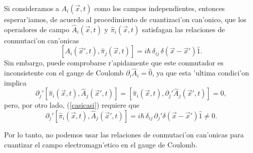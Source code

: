 Si consideramos a $A_i(\vec{x},t) $ como los campos independientes, entonces
esperar'iamos, de acuerdo al procedimiento de cuantizaci'on can'onico, que los
operadores de campo $\hat{A}_i(\vec{x},t)$ y $\hat{\pi}_i(\vec{x},t)$ satisfagan
las relaciones de conmutaci'on can'onicas
\begin{equation}
\left[\hat{A}_i(\vec{x}',t),\hat{\pi}_j(\vec{x},t)\right]
=i\hbar\,\delta_{ij}\,\delta(\vec{x}-\vec{x}') \hat{1}. \label{casicasi}
\end{equation}
Sin embargo, puede comprobarse r'apidamente que este conmutador es inconsistente
con el gauge de Coulomb
$\partial_i\hat{A}_{i}=\hat{0}$, ya que esta 'ultima condici'on implica
\begin{equation}
\partial_{j}'\left[ \hat{\pi}_i(\vec{x},t) ,\hat{A}_{j}(\vec{x}',t) \right] =
\left[ \hat{\pi}_i(\vec{x},t) ,\partial_{j}'\hat{A}_{j}(\vec{x}',t) \right] =0,
\end{equation}
pero, por otro lado, (\ref{casicasi}) requiere que
\begin{equation}
\partial_{j}'\left[ \hat{\pi}_i(\vec{x},t) ,\hat{A}_{j}(\vec{x}',t) \right]
=i\hbar\,\delta_{ij}\,\partial_{j}'\delta(\vec{x}-\vec{x}') \hat{1}\neq 0 .
\end{equation} 

Por lo tanto, no podemos usar las relaciones de conmutaci'on can'onicas para
cuantizar el campo electromagn'etico en el gauge de Coulomb.

